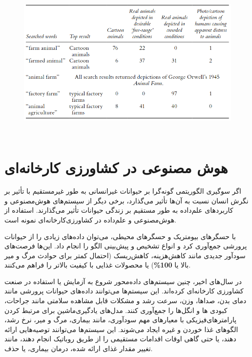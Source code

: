 \begin{figure}
    \centering
    \includegraphics[width=1\textwidth, trim={0 2cm 0 0}]{static/assets/img/figure2}
    \label{}
\end{figure}
‌
\newline
\newline



{
\section*{هوش مصنوعی در کشاورزی کارخانه‌ای}
\label{sec:هوش مصنوعی در کشاورزی کارخانه‌ای}
اگر سوگیری الگوریتمی گونه‌گرا بر حیوانات غیرانسانی به طور غیرمستقیم با تأثیر بر نگرش انسان نسبت به آن‌ها تأثیر می‌گذارد، برخی دیگر از سیستم‌های هوش‌مصنوعی و کاربردهای علم‌داده به طور مستقیم بر زندگی حیوانات تأثیر می‌گذارند. استفاده از هوش‌مصنوعی و علم‌داده در کشاورزی‌کارخانه‌ای نمونه است.
}

با حسگرهای بیومتریک و حسگرهای محیطی، می‌توان داده‌های زیادی را از حیوانات پرورشی جمع‌آوری کرد و انواع تشخیص و پیش‌بینی الگو را انجام داد.
این‌ها فرصت‌های سودآور جدیدی مانند کاهش‌هزینه، کاهش‌ریسک (احتمال کمتر برای حوادث مرگ و میر بالا یا \textenglish{\textbf{100\%}}) یا محصولات غذایی با کیفیت بالاتر را فراهم می‌کنند.

در سال‌های اخیر، چنین سیستم‌های داده‌محور شروع به آزمایش یا استفاده در صنعت کشاورزی کارخانه‌ای کرده‌اند.
این سیستم‌ها می‌توانند داده‌های حیوانات پرورشی مانند دمای بدن، صداها، وزن، سرعت رشد و مشکلات قابل مشاهده سلامتی مانند جراحات، کبودی ها و انگل‌ها را جمع‌آوری کنند.
مدل‌های یادگیری‌ماشین برای مرتبط کردن پارامترهای‌فیزیکی با معیارهای مهم سودآوری، مانند بیماری، مرگ و میر، نرخ رشد، الگوهای غذا خوردن و غیره ایجاد می‌شوند.
این سیستم‌ها می‌توانند توصیه‌هایی ارائه دهند، یا حتی گاهی اوقات اقدامات مستقیمی را از طریق روباتیک انجام دهند، مانند تغییر مقدار غذای ارائه شده، درمان بیماری، یا حذف.

